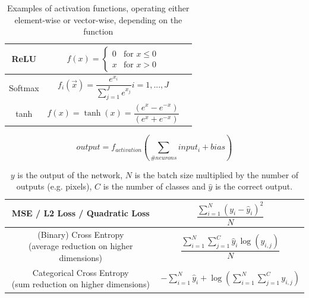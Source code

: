 \begin{table}[]
    \centering
    \setcellgapes{3pt}
    \makegapedcells
    \begin{tabular}{|c|c|c}
    \hline
    ReLU & $f(x) = \begin{cases}
	0 & \text{for } x \le 0\\
	x & \text{for } x > 0\end{cases}$ \\ \hline
    Softmax & $f_i(\vec{x}) = \dfrac{e^{x_i}}{\sum_{j=1}^J e^{x_j}} i = 1, ..., J$ \\ \hline
    tanh & $f(x)=\tanh(x)=\dfrac{(e^{x} - e^{-x})}{(e^{x} + e^{-x})}$ \\ \hline
    \end{tabular}
    \caption{Examples of activation functions, operating either element-wise or vector-wise, depending on the function}
    \label{tab:activation_functions}
\end{table}

\begin{equation}
    \label{eq:fully_connected}
    output = f_{activation}\left(\displaystyle\sum_{\#neurons} input_i + bias\right)
\end{equation}

\begin{table}
    \centering
    \begin{adjustbox}{width={0.9\textwidth},totalheight={\textheight},keepaspectratio} %
    \setcellgapes{3pt}
    \makegapedcells
    \begin{tabular}{|c|c|}
    \hline
    MSE / L2 Loss / Quadratic Loss & $\dfrac{\sum_{i=1}^{N} \left(y_i - \hat{y}_i\right)^2}{N}$ \\ \hline
    \makecell{(Binary) Cross Entropy \\ (average reduction on higher dimensions)} & $\dfrac{\sum_{i=1}^{N} \sum_{j=1}^{C} \hat{y}_i \log\left(y_{i,j}\right)}{N}$ \\ \hline
    \makecell{Categorical Cross Entropy \\ (sum reduction on higher dimensions)} & $- \sum_{i=1}^{N} \hat{y}_i +  \log\left(\sum_{i=1}^{N} \sum_{j=1}^{C} y_{i,j}\right)$ \\ \hline
    \end{tabular}
    \end{adjustbox} %
    \caption{$y$ is the output of the network, $N$ is the batch size multiplied by the number of outputs (e.g. pixels), $C$ is the number of classes and $\hat{y}$ is the correct output.}
    \label{tab:loss_functions}
\end{table}


